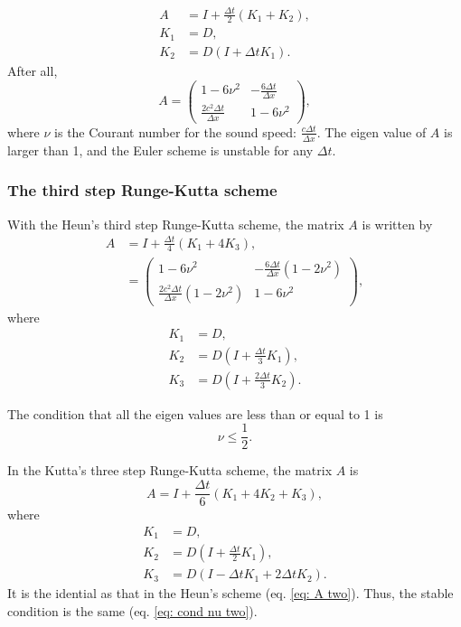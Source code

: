 \begin{align}
  A &= I + \frac{\Delta t}{2}(K_1 + K_2), \\
  K_1 &= D, \\
  K_2 &= D (I + \Delta t K_1).
\end{align}
After all,
\begin{equation}
  A = \begin{pmatrix}
    1-6\nu^2 & -\frac{6\Delta t}{\Delta x} \\
    \frac{2c^2\Delta t}{\Delta x} & 1-6\nu^2
    \end{pmatrix},
\end{equation}
where $\nu$ is the Courant number for the sound speed: $\frac{c\Delta t}{\Delta x}$.
The eigen value of $A$ is larger than 1, and the Euler scheme is unstable for any $\Delta t$.



\subsubsection{The third step Runge-Kutta scheme}
With the Heun's third step Runge-Kutta scheme, the matrix $A$ is written by
\begin{align}
  A &= I + \frac{\Delta t}{4}(K_1 + 4K_3), \\
  &= \begin{pmatrix}
    1-6\nu^2 & -\frac{6\Delta t}{\Delta x}(1-2\nu^2) \\
    \frac{2c^2\Delta t}{\Delta x}(1-2\nu^2) & 1-6\nu^2
  \end{pmatrix}, \label{eq: A two}
\end{align}
where
\begin{align}
  K_1 &= D, \\
  K_2 &= D (I + \frac{\Delta t}{3}K_1), \\
  K_3 &= D (I + \frac{2\Delta t}{3}K_2).
\end{align}

The condition that all the eigen values are less than or equal to 1 is
\begin{equation}
  \nu \leq \frac{1}{2}. \label{eq: cond nu two}
\end{equation}

In the Kutta's three step Runge-Kutta scheme, the matrix $A$ is
\begin{equation}
  A = I + \frac{\Delta t}{6}(K_1 + 4K_2 + K_3),
\end{equation}
where
\begin{align}
  K_1 &= D, \\
  K_2 &= D \left(I + \frac{\Delta t}{2}K_1\right), \\
  K_3 &= D \left(I - \Delta t K_1 + 2\Delta t K_2\right).
\end{align}
It is the idential as that in the Heun's scheme (eq. \ref{eq: A two}).
Thus, the stable condition is the same (eq. \ref{eq: cond nu two}).

